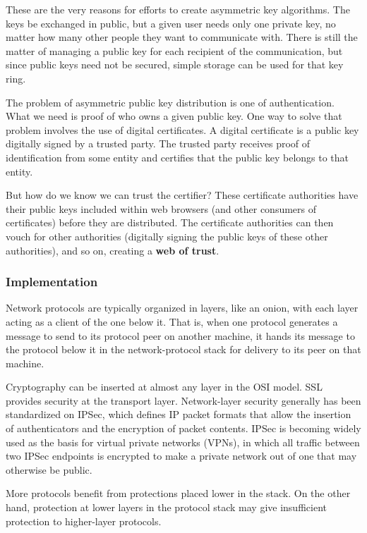These are the very reasons for efforts to create asymmetric key algorithms.
The keys be exchanged in public, but a given user needs only one private key, no matter how many other people they want to communicate with.
There is still the matter of managing a public key for each recipient of the communication, but since public keys need not be secured, simple storage can be used for that key ring.

The problem of asymmetric public key distribution is one of authentication.
What we need is proof of who owns a given public key.
One way to solve that problem involves the use of digital certificates.
A digital certificate is a public key digitally signed by a trusted party.
The trusted party receives proof of identification from some entity and certifies that the public key belongs to that entity.

But how do we know we can trust the certifier?
These certificate authorities have their public keys included within web browsers (and other consumers of certificates) before they are distributed.
The certificate authorities can then vouch for other authorities (digitally signing the public keys of these other authorities), and so on, creating a \textbf{web of trust}.

\subsubsection{Implementation}\label{subsubsec:Implementation_of_Cryptography}
Network protocols are typically organized in layers, like an onion, with each layer acting as a client of the one below it.
That is, when one protocol generates a message to send to its protocol peer on another machine, it hands its message to the protocol below it in the network-protocol stack for delivery to its peer on that machine.

Cryptography can be inserted at almost any layer in the OSI model.
SSL provides security at the transport layer.
Network-layer security generally has been standardized on IPSec, which defines IP packet formats that allow the insertion of authenticators and the encryption of packet contents.
IPSec is becoming widely used as the basis for virtual private networks (VPNs), in which all traffic between two IPSec endpoints is encrypted to make a private network out of one that may otherwise be public.

More protocols benefit from protections placed lower in the stack.
On the other hand, protection at lower layers in the protocol stack may give insufficient protection to higher-layer protocols.

